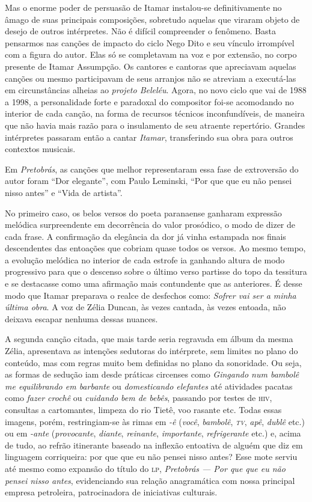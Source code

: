 Mas o enorme poder de persuasão de Itamar instalou-se definitivamente no
âmago de suas principais composições, sobretudo aquelas que viraram
objeto de desejo de outros intérpretes. Não é difícil compreender o
fenômeno. Basta pensarmos nas canções de impacto do ciclo Nego Dito e
seu vínculo irrompível com a figura do autor. Elas só se completavam na
voz e por extensão, no corpo presente de Itamar Assumpção. Os cantores e
cantoras que apreciavam aquelas canções ou mesmo participavam de seus
arranjos não se atreviam a executá-las em circunstâncias alheias ao
\textit{projeto Beleléu}. Agora, no novo ciclo que vai de 1988 a 1998, a
personalidade forte e paradoxal do compositor foi-se acomodando no
interior de cada canção, na forma de recursos técnicos inconfundíveis,
de maneira que não havia mais razão para o insulamento de seu atraente
repertório. Grandes intérpretes passaram então a cantar \textit{Itamar},
transferindo sua obra para outros contextos musicais.

Em \textit{Pretobrás}, as canções que melhor representaram essa fase de
extroversão do autor foram ``Dor elegante'', com Paulo Leminski, ``Por que que
eu não pensei nisso antes'' e ``Vida de artista''.

No primeiro caso, os belos versos do poeta paranaense ganharam expressão
melódica surpreendente em decorrência do valor prosódico, o modo de dizer 
de cada frase. A confirmação da elegância da dor já vinha estampada nos
finais descendentes das entoações que cobriam quase todos os versos. Ao
mesmo tempo, a evolução melódica no interior de cada estrofe ia ganhando
altura de modo progressivo para que o descenso sobre o último verso
partisse do topo da tessitura e se destacasse como uma afirmação mais
contundente que as anteriores. É desse modo que Itamar preparava o
realce de desfechos como: \textit{Sofrer vai ser a minha última obra}. A voz
de Zélia Duncan, às vezes cantada, às vezes entoada, não deixava escapar
nenhuma dessas nuances.

A segunda canção citada, que mais tarde seria regravada em álbum da
mesma Zélia, apresentava as intenções sedutoras do intérprete, sem
limites no plano do conteúdo, mas com regras muito bem definidas no
plano da sonoridade. Ou seja, as formas de sedução iam desde práticas
circenses como \textit{Gingando num bambolê me equilibrando em barbante} ou
\textit{domesticando elefantes} até atividades pacatas como \textit{fazer crochê}
ou \textit{cuidando bem de bebês}, passando por testes de \textsc{hiv}, consultas a
cartomantes, limpeza do rio Tietê, voo rasante etc. Todas essas imagens,
porém, restringiam-se às rimas em \textit{-ê} (\textit{você}, \textit{bambolê}, \textit{\textsc{tv}},
\textit{apê}, \textit{dublê} etc.) ou em \textit{-ante} (\textit{provocante}, \textit{diante},
\textit{reinante}, \textit{importante}, \textit{refrigerante} etc.) e, acima de tudo,
ao refrão itinerante baseado na inflexão entoativa de alguém que diz em
linguagem corriqueira: por que que eu não pensei nisso antes? Esse mote
serviu até mesmo como expansão do título do \textsc{lp}, \textit{Pretobrás --- Por que que
eu não pensei nisso antes}, evidenciando sua relação anagramática com
nossa principal empresa petroleira, patrocinadora de iniciativas
culturais.

